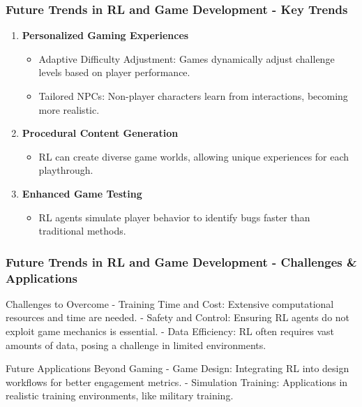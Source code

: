 \documentclass[aspectratio=169]{beamer}
\begin{document}
\begin{frame}[fragile]
    \frametitle{Future Trends in RL and Game Development - Key Trends}
    \begin{enumerate}
        \item \textbf{Personalized Gaming Experiences}
            \begin{itemize}
                \item Adaptive Difficulty Adjustment: Games dynamically adjust challenge levels based on player performance.
                \item Tailored NPCs: Non-player characters learn from interactions, becoming more realistic.
            \end{itemize}
        \item \textbf{Procedural Content Generation}
            \begin{itemize}
                \item RL can create diverse game worlds, allowing unique experiences for each playthrough.
            \end{itemize}
        \item \textbf{Enhanced Game Testing}
            \begin{itemize}
                \item RL agents simulate player behavior to identify bugs faster than traditional methods.
            \end{itemize}
    \end{enumerate}
\end{frame}

\begin{frame}[fragile]
    \frametitle{Future Trends in RL and Game Development - Challenges & Applications}
    \begin{block}{Challenges to Overcome}
        - Training Time and Cost: Extensive computational resources and time are needed.
        - Safety and Control: Ensuring RL agents do not exploit game mechanics is essential.
        - Data Efficiency: RL often requires vast amounts of data, posing a challenge in limited environments.
    \end{block}
    \begin{block}{Future Applications Beyond Gaming}
        - Game Design: Integrating RL into design workflows for better engagement metrics.
        - Simulation Training: Applications in realistic training environments, like military training.
    \end{block}
\end{frame}
\end{document}
